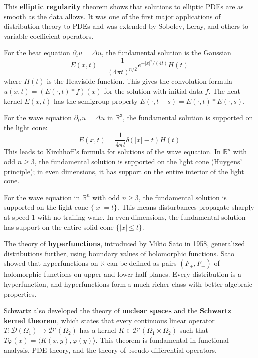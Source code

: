 This \textbf{elliptic regularity} theorem shows that solutions to elliptic PDEs are as smooth as the data allows. It was one of the first major applications of distribution theory to PDEs and was extended by Sobolev, Leray, and others to variable-coefficient operators.

For the heat equation $\partial_t u = \Delta u$, the fundamental solution is the Gaussian
\[E(x,t) = \frac{1}{(4\pi t)^{n/2}} e^{-|x|^2/(4t)} H(t)\]
where $H(t)$ is the Heaviside function. This gives the convolution formula $u(x,t) = (E(\cdot,t) * f)(x)$ for the solution with initial data $f$. The heat kernel $E(x,t)$ has the semigroup property $E(\cdot, t+s) = E(\cdot, t) * E(\cdot, s)$.

For the wave equation $\partial_{tt} u = \Delta u$ in $\mathbb{R}^3$, the fundamental solution is supported on the light cone:
\[E(x,t) = \frac{1}{4\pi t} \delta(|x| - t) H(t)\]
This leads to Kirchhoff's formula for solutions of the wave equation. In $\mathbb{R}^n$ with odd $n \geq 3$, the fundamental solution is supported on the light cone (Huygens' principle); in even dimensions, it has support on the entire interior of the light cone.

\begin{theorem}
For the wave equation in $\mathbb{R}^n$ with odd $n \geq 3$, the fundamental solution is supported on the light cone $\{|x| = t\}$. This means disturbances propagate sharply at speed 1 with no trailing wake. In even dimensions, the fundamental solution has support on the entire solid cone $\{|x| \leq t\}$.
\end{theorem}

The theory of \textbf{hyperfunctions}, introduced by Mikio Sato in 1958, generalized distributions further, using boundary values of holomorphic functions. Sato showed that hyperfunctions on $\mathbb{R}$ can be defined as pairs $(F_+, F_-)$ of holomorphic functions on upper and lower half-planes. Every distribution is a hyperfunction, and hyperfunctions form a much richer class with better algebraic properties.

Schwartz also developed the theory of \textbf{nuclear spaces} and the \textbf{Schwartz kernel theorem}, which states that every continuous linear operator $T: \mathcal{D}(\Omega_1) \to \mathcal{D}'(\Omega_2)$ has a kernel $K \in \mathcal{D}'(\Omega_1 \times \Omega_2)$ such that $T\varphi(x) = \langle K(x,y), \varphi(y) \rangle$. This theorem is fundamental in functional analysis, PDE theory, and the theory of pseudo-differential operators.

